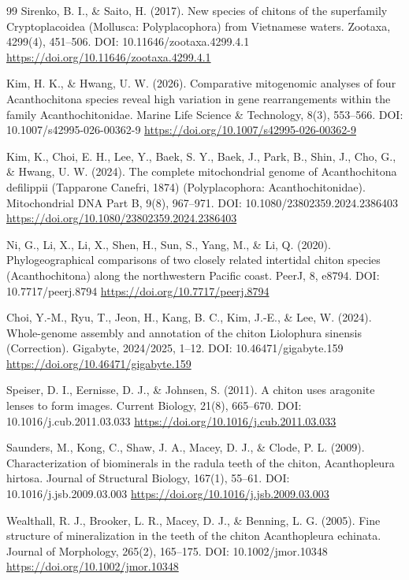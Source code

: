 \documentclass[11pt]{article}
\begin{document}
\begin{thebibliography}{99}
Sirenko, B. I., \& Saito, H. (2017). New species of chitons of the superfamily Cryptoplacoidea (Mollusca: Polyplacophora) from Vietnamese waters. Zootaxa, 4299(4), 451--506. DOI: 10.11646/zootaxa.4299.4.1 \url{https://doi.org/10.11646/zootaxa.4299.4.1}

Kim, H. K., \& Hwang, U. W. (2026). Comparative mitogenomic analyses of four Acanthochitona species reveal high variation in gene rearrangements within the family Acanthochitonidae. Marine Life Science \& Technology, 8(3), 553--566. DOI: 10.1007/s42995-026-00362-9 \url{https://doi.org/10.1007/s42995-026-00362-9}

Kim, K., Choi, E. H., Lee, Y., Baek, S. Y., Baek, J., Park, B., Shin, J., Cho, G., \& Hwang, U. W. (2024). The complete mitochondrial genome of Acanthochitona defilippii (Tapparone Canefri, 1874) (Polyplacophora: Acanthochitonidae). Mitochondrial DNA Part B, 9(8), 967--971. DOI: 10.1080/23802359.2024.2386403 \url{https://doi.org/10.1080/23802359.2024.2386403}

Ni, G., Li, X., Li, X., Shen, H., Sun, S., Yang, M., \& Li, Q. (2020). Phylogeographical comparisons of two closely related intertidal chiton species (Acanthochitona) along the northwestern Pacific coast. PeerJ, 8, e8794. DOI: 10.7717/peerj.8794 \url{https://doi.org/10.7717/peerj.8794}

Choi, Y.-M., Ryu, T., Jeon, H., Kang, B. C., Kim, J.-E., \& Lee, W. (2024). Whole-genome assembly and annotation of the chiton Liolophura sinensis (Correction). Gigabyte, 2024/2025, 1--12. DOI: 10.46471/gigabyte.159 \url{https://doi.org/10.46471/gigabyte.159}

Speiser, D. I., Eernisse, D. J., \& Johnsen, S. (2011). A chiton uses aragonite lenses to form images. Current Biology, 21(8), 665--670. DOI: 10.1016/j.cub.2011.03.033 \url{https://doi.org/10.1016/j.cub.2011.03.033}

Saunders, M., Kong, C., Shaw, J. A., Macey, D. J., \& Clode, P. L. (2009). Characterization of biominerals in the radula teeth of the chiton, Acanthopleura hirtosa. Journal of Structural Biology, 167(1), 55--61. DOI: 10.1016/j.jsb.2009.03.003 \url{https://doi.org/10.1016/j.jsb.2009.03.003}

Wealthall, R. J., Brooker, L. R., Macey, D. J., \& Benning, L. G. (2005). Fine structure of mineralization in the teeth of the chiton Acanthopleura echinata. Journal of Morphology, 265(2), 165--175. DOI: 10.1002/jmor.10348 \url{https://doi.org/10.1002/jmor.10348}


\end{thebibliography}
\end{document}
